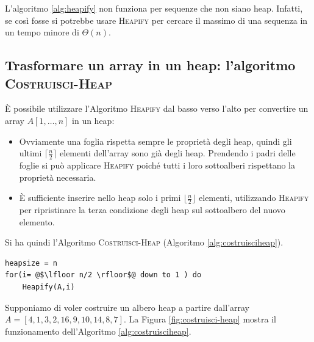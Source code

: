 L'algoritmo \ref{alg:heapify} non funziona per sequenze che non siano  heap. Infatti, se così fosse si potrebbe usare \textsc{Heapify} per cercare il massimo di una sequenza in un tempo minore di $\Theta(n)$.

\subsection{Trasformare un array in un heap: l'algoritmo \textsc{Costruisci-Heap}}

È possibile utilizzare l'Algoritmo \textsc{Heapify} dal basso verso l'alto per convertire un array $A[1,\ldots,n]$ in un heap:
\begin{itemize}
	\item  Ovviamente una foglia rispetta sempre le proprietà degli heap,  quindi gli ultimi $\lceil \frac{n}{2} \rceil$ elementi dell'array sono già degli heap. Prendendo i padri delle foglie si può applicare \textsc{Heapify} poiché tutti i loro sottoalberi rispettano la proprietà necessaria.
	\item È sufficiente inserire nello heap solo i primi $\lfloor \frac{n}{2} \rfloor$ elementi, utilizzando \textsc{Heapify} per ripristinare la terza condizione degli heap sul sottoalbero del nuovo elemento.
\end{itemize}

Si ha quindi l'Algoritmo \textsc{Costruisci-Heap} (Algoritmo \ref{alg:costruisciheap}).

\begin{lstlisting}[language=asd,caption={\textsc{Costruisci-Heap}(A,n)},label=alg:costruisciheap]
heapsize = n
for(i= @$\lfloor n/2 \rfloor$@ down to 1 ) do
	Heapify(A,i)
\end{lstlisting}

\begin{example}
	Supponiamo di voler costruire un albero heap a partire dall'array $A=[4,1,3,2,16,9,10,14,8,7]$. La Figura \ref{fig:costruisci-heap} mostra il funzionamento dell'Algoritmo \ref{alg:costruisciheap}.
\end{example}

